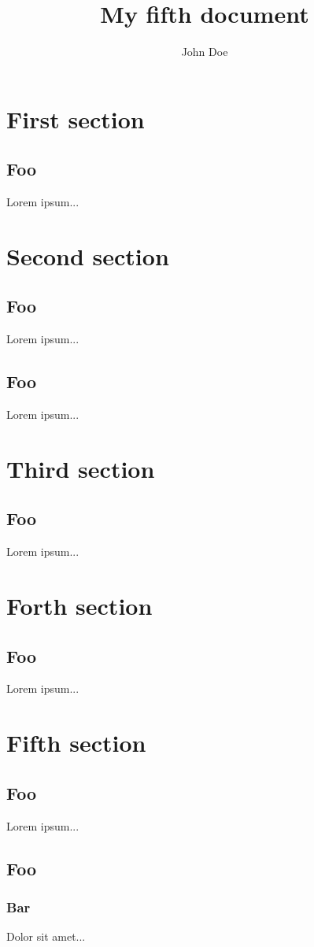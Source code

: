 \documentclass{article}
\title{My fifth document}
\author{John Doe}
\begin{document}
   \maketitle
   \tableofcontents
   \newpage
   \section{First section}
   \subsection{Foo}
   Lorem ipsum...
   \section{Second section}
   \subsection{Foo}
   Lorem ipsum...
   \subsection{Foo}
   Lorem ipsum...
   \section{Third section}
   \subsection{Foo}
   Lorem ipsum...
   \section{Forth section}
   \subsection{Foo}
   Lorem ipsum...
   \section{Fifth section}
   \subsection{Foo}
   Lorem ipsum...
   \subsection{Foo}
   \subsubsection{Bar}
   Dolor sit amet...
\end{document}
